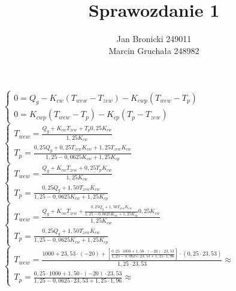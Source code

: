 \documentclass{article}
\title{Sprawozdanie 1}
\author{Jan Bronicki 249011\\
Marcin Gruchała 248982\\}
\date{}
\begin{document}
\maketitle
\begin{center}
    \vspace{1ex}
    $
    \begin{cases}
        0=Q_{g} -K_{cw} (T_{wew} - T_{zew})-K_{cwp} (T_{wew} -T_{p})\\
        0=K_{cwp}(T_{wew}-T_{p})-K_{cp}(T_{p}-T_{zew})
    \end{cases}
    $
    \\
    \vspace{1ex}
    $
    \begin{cases}
        T_{wew}=\frac{Q_{g}+K_{cw}T_{zew}+T_{p} 0,25 K_{cw}}{1,25K_{cw}}\\
        T_{p}=\frac{0,25Q_{g}+0,25T_{zew}K_{cw}+1,25T_{zew}K_{cw}}{1,25-0,0625K_{cw}+1,25K_{cp}}
    \end{cases}
    $
    \\
    \vspace{1ex}
    $
    \begin{cases}
        T_{wew}=\frac{Q_{g}+K_{cw}T_{zew}+0,25T_{p}K_{cw}}{1,25K_{cw}}\\
        T_{p}=\frac{0,25Q_{g}+1,50T_{zew}K_{cw}}{1,25-0,0625K_{cw}+1,25K_{cp}}
    \end{cases}
    $
    \\
    \vspace{1ex}
    $
    \begin{cases}
        T_{wew}=\frac{Q_{g}+K_{cw}T_{zew}+\frac{0,25Q_{g}+1,50T_{zew}K_{cw}}{1,25-0,0625K_{cw}+1,25K_{cp}} 0,25 K_{cw}}{1,25K_{cw}}\\
        T_{p}=\frac{0,25Q_{g}+1,50T_{zew}K_{cw}}{1,25-0,0625K_{cw}+1,25K_{cp}}
    \end{cases}
    $
    \\
    \vspace{1ex}
    $
    \begin{cases}
        T_{wew}=\frac{1000+23,53\cdot(-20)+\left[\frac{0,25\cdot1000+1,50\cdot(-20)\cdot 23,53}{1,25-0,0625\cdot23,53+1,25\cdot1,96}\right] \cdot(0,25 \cdot23,53)}{1,25\cdot23,53}\approx\\
        T_{p}=\frac{0,25\cdot1000+1,50\cdot(-20)\cdot23,53}{1,25-0,0625\cdot 23,53+1,25\cdot1,96}\approx
    \end{cases}
    $
\end{center}
\end{document}
